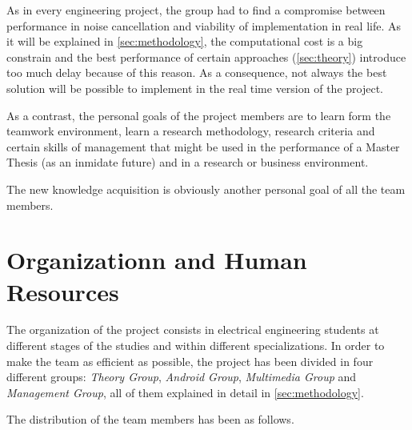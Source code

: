 \documentclass[11pt,a4paper,english]{book}  %
\theoremstyle{definition}  %
\theoremstyle{plain}  %
\theoremstyle{remark}  %
\begin{document}
	As in every engineering project, the group had to find a compromise between performance in noise cancellation and viability of implementation in real life. As it will be explained in \ref{sec:methodology}, the computational cost is a big constrain and the best performance of certain approaches (\ref{sec:theory}) introduce too much delay because of this reason. As a consequence, not always the best solution will be possible to implement in the real time version of the project.
	
	As a contrast, the personal goals of the project members are to learn form the teamwork environment, learn a research methodology, research criteria and certain skills of management that might be used in the performance of a Master Thesis (as an inmidate future) and in a research or business environment.
	
	The new knowledge acquisition is obviously another personal goal of all the team members.
	
	
	\section{Organizationn and Human Resources}
	\label{organization}

The organization of the project consists in electrical engineering students at different stages of the studies and within different specializations. In order to make the team as efficient as possible, the project has been divided in four different groups: \textit{Theory Group}, \textit{Android Group}, \textit{Multimedia Group} and \textit{Management Group}, all of them explained in detail in \ref{sec:methodology}.

The distribution of the team members has been as follows.
\end{document}
